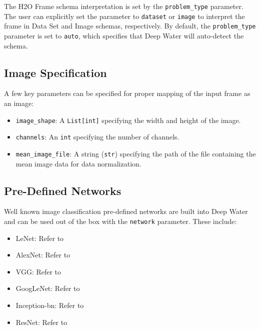 		The H2O Frame schema interpretation is set by the \texttt{problem\_type} parameter.  The user can explicitly set the parameter to \texttt{dataset} or \texttt{image} to interpret the frame in Data Set and Image schemas, respectively.  By default, the \texttt{problem\_type} parameter is set to \texttt{auto}, which specifies that Deep Water will auto-detect the schema.
	
		\subsection{Image Specification}
			A few key parameters can be specified for proper mapping of the input frame as an image:		
			\begin{itemize}
				\item{\texttt{image\_shape}}: A \texttt{List[int]} specifying the width and height of the image.
				\item{\texttt{channels}}: An \texttt{int} specifying the number of channels.
				\item{\texttt{mean\_image\_file}}: A string (\texttt{str}) specifying the path of the file containing the mean image data for data normalization.
			\end{itemize}

\newpage
\waterExampleInPython


		\subsection{Pre-Defined Networks}
			Well known image classification pre-defined networks are built into Deep Water and can be used out of the box with the \texttt{network} parameter.  These include: 
			
			\begin{itemize}
			
			\item LeNet: Refer to \textit{} {\cite{lenet}}
			\item AlexNet: Refer to \textit{} {\cite{alexnet}}
			\item VGG: Refer to \textit{} {\cite{vgg}}
			\item GoogLeNet: Refer to \textit{} {\cite{googlenet}}
			\item Inception-bn: Refer to \textit{} {\cite{inceptionbn}}
			\item ResNet: Refer to \textit{} {\cite{resnet}}
			
			\end{itemize}
		
